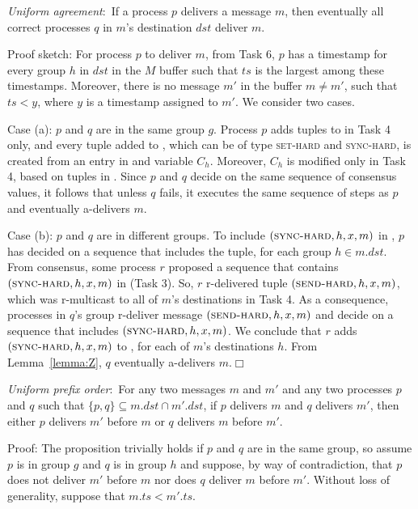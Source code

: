 \setcounter{proposition}{4}
\begin{proposition}
\textit{Uniform agreement}:~If a process $p$ delivers a message $m$, then eventually all correct processes $q$ in $m$'s destination $dst$ deliver $m$.
\end{proposition}
\noindent
{\sc Proof sketch:} 
For process $p$ to deliver $m$, from Task 6, $p$ has a timestamp for every group $h$ in $dst$ in the $M$ buffer such that $ts$ is the largest among these timestamps.
Moreover, there is no message $m'$ in the buffer $m \neq m'$, such that $ts < y$, where $y$ is a timestamp assigned to $m'$.
We consider two cases.

Case (a): $p$ and $q$ are in the same group $g$.
Process $p$ adds tuples to \Buffer in Task 4 only, and every tuple added to \Buffer, which can be of type \textsc{set-hard} and \textsc{sync-hard}, is created from an entry in \Decided and variable $C_h$.
Moreover, $C_h$ is modified only in Task 4, based on tuples in \Decided.
Since $p$ and $q$ decide on the same sequence of consensus values, it follows that unless $q$ fails, it executes the same sequence of steps as $p$ and eventually a-delivers $m$.

Case (b): $p$ and $q$ are in different groups.
To include $(\textsc{sync-hard}, h, x, m)$ in \Buffer, $p$ has decided on a sequence that includes the tuple, for each group $h \in m.dst$.
From consensus, some process $r$ proposed a sequence that contains $(\textsc{sync-hard}, h, x, m)$ in \Pend (Task 3).
So, $r$ r-delivered tuple $(\textsc{send-hard}, h, x, m)$, which was r-multicast to all of $m$'s destinations in Task 4.
As a consequence, processes in $q$'s group r-deliver message $(\textsc{send-hard}, h, x, m)$ and decide on a sequence that includes $(\textsc{sync-hard}, h, x, m)$.
We conclude that $r$ adds $(\textsc{sync-hard}, h, x, m)$ to \Buffer, for each of $m$'s destinations $h$.
From Lemma~\ref{lemma:Z}, $q$ eventually a-delivers $m$.\hfill$\Box$


\begin{proposition}
\textit{Uniform prefix order}:~For any two messages $m$ and $m'$ and any two processes $p$ and $q$ such that $\lbrace p, q\rbrace \subseteq m.\mathit{dst} \cap m'.\mathit{dst}$, if $p$ delivers $m$ and $q$ delivers $m'$, then either $p$ delivers $m'$ before $m$ or $q$ delivers $m$ before $m'$.
\end{proposition}
\noindent
{\sc Proof:} 
The proposition trivially holds if $p$ and $q$ are in the same group, so assume $p$ is in group $g$ and $q$ is in group $h$ and suppose, by way of contradiction, that $p$ does not deliver $m'$ before $m$ nor does $q$ deliver $m$ before $m'$. 
Without loss of generality, suppose that $m.ts < m'.ts$. 

